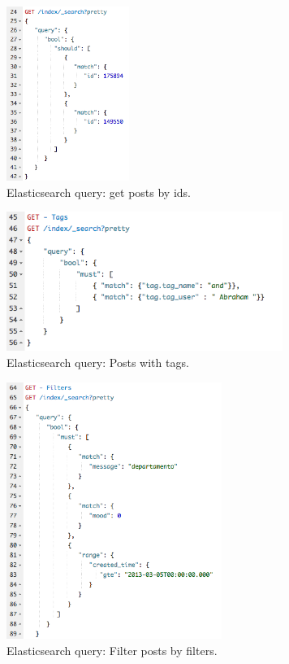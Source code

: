 \begin{figure}[ht!]
	\centering
	\includegraphics[width=40mm]{Imagens/es-get-posts-by-ids.png}
	\caption{Elasticsearch query: get posts by ids. \label{fig:es-query-es-get-posts-by-ids}}
\end{figure}

\begin{figure}[ht!]
	\centering
	\includegraphics[width=90mm]{Imagens/es-get-tags.png}
	\caption{Elasticsearch query: Posts with tags. \label{fig:es-query-es-get-tags}}
\end{figure}


\begin{figure}[ht!]
	\centering
	\includegraphics[width=70mm]{Imagens/es-get-filters.png}
	\caption{Elasticsearch query: Filter posts by filters. \label{fig:es-get-filters}}
\end{figure}

